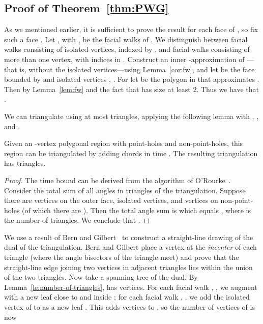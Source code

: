 \documentclass{llncs}
\begin{document}
\subsection{Proof of Theorem~\ref{thm:PWG}}\label{sec:PPWG}

As we mentioned earlier, it is sufficient to prove the result for each face of , so fix such a face .
Let , with , be the facial walks of . We distinguish between facial walks consisting of isolated vertices, indexed by , and facial walks consisting of more than one vertex, with indices in .
Construct an inner -approximation  of ---that is,  without the isolated vertices---using Lemma~\ref{cor:fw}, and let  be the face bounded by  and isolated vertices , .
For  let  be the polygon in  that approximates .
Then
 by Lemma~\ref{lem:fw} and the fact that  has size at least 2.
Thus we have that .




We can triangulate  using at most  triangles, applying the following lemma with , , and .

\begin{lemma}\label{le:number-of-triangles}
Given an -vertex polygonal region with  point-holes and  non-point-holes, this region can be triangulated by adding chords in time . The resulting triangulation has  triangles.
\end{lemma}

\begin{proof}
The time bound can be derived from the algorithm of O'Rourke~\cite[Lemma 5.1]{OR87}. Consider the total sum of all angles in triangles of the triangulation. Suppose there are  vertices on the outer face,  isolated vertices, and  vertices on non-point-holes (of which there are ). Then the total angle sum is  which equals , where  is the number of triangles. We conclude that .
\end{proof}





We use a result of Bern and Gilbert~\cite{BG92} to construct a straight-line drawing of the dual of the triangulation.  Bern and Gilbert place a vertex at the {\em incenter} of each
triangle (where the angle bisectors of the triangle meet) and prove that the straight-line edge joining two vertices in adjacent triangles lies within the union of the two triangles. Now take a spanning tree  of the dual. By Lemma~\ref{le:number-of-triangles},  has  vertices. For each facial walk , , we augment  with a new leaf   close to  and inside ; for each facial walk , , we add the isolated vertex of  to  as a new leaf . This adds  vertices to , so the number of vertices of  is now 
\end{document}
